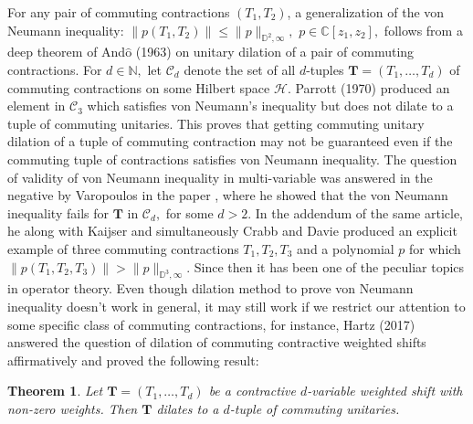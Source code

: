 \documentclass[12pt,reqno] {amsart}
\newtheorem{theorem}{Theorem}
\theoremstyle{remark}
\theoremstyle{definition}
\begin{document}
For any pair of commuting contractions $(T_1,T_2)$, a generalization of the von Neumann inequality:
$\|p(T_1,T_2)\|\leqslant \|p\|_{\mathbb D^2,\infty},$ $p\in\mathbb{C}[z_1,z_2],$ 
follows from a deep theorem of And$\hat{\mbox{o}}$ (1963)\cite{Ando} on unitary dilation of a pair of commuting contractions. For $d\in\mathbb N,$ let 
$\mathscr{C}_d$ denote the set of all $d$-tuples $\boldsymbol T=(T_1,\ldots,T_d)$ of commuting contractions 
on some Hilbert space $\mathcal{H}.$ 
Parrott (1970)\cite{Parrott} produced an element in $\mathscr C_3$ which satisfies von Neumann’s inequality but does not dilate to a tuple of commuting
unitaries. This proves that getting commuting unitary dilation of a tuple of commuting contraction may not be guaranteed even if the commuting tuple of contractions satisfies von Neumann inequality. The question of validity of von Neumann inequality in multi-variable was answered in the negative by Varopoulos in the paper \cite{V1}, where he showed 
that the von Neumann inequality 
fails for $\boldsymbol T$ in $\mathscr{C}_d,$ for some $d > 2.$ 
In the addendum of the same article, he along with Kaijser \cite{V1} and 
simultaneously Crabb and Davie \cite{CD} 
produced an explicit example of 
three commuting contractions $T_1,T_2,T_3$ 
and a polynomial $p$ for which 
$\|p(T_1,T_2,T_3)\| > \|p\|_{\mathbb D^3,\infty}.$ 
Since then it has been one of the peculiar topics in operator theory. Even though dilation method to prove von Neumann inequality doesn't work in general, it may still work if we restrict our attention to some specific class of commuting contractions, for instance, Hartz (2017)\cite{Hz} answered the question of dilation of commuting contractive weighted shifts affirmatively and proved the following result:
\begin{theorem}\cite[Theorem 1.1]{Hz}
Let $\boldsymbol T = (T_1, \ldots, T_d)$ be a contractive $d$-variable weighted shift with non-zero weights. Then $\boldsymbol T$ dilates to a $d$-tuple of commuting unitaries.
\end{theorem}
\end{document}
